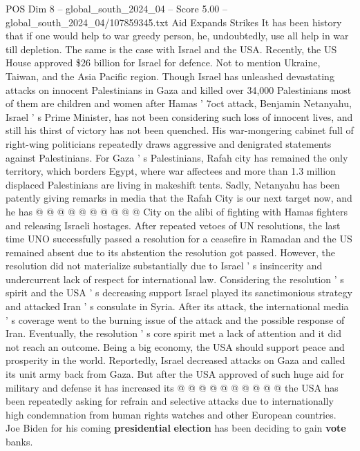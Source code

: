 \begin{textsample}{POS Dim 8 – global\_south\_2024\_04 – Score 5.00 – global\_south\_2024\_04/107859345.txt}  \label{ex:f8_pos_196}
Aid Expands Strikes It has been history that if one would help to war greedy person, he, undoubtedly, use all help in war till depletion.
The same is the case with Israel and the USA.
Recently, the US House approved \$26 billion for Israel for defence.
Not to mention Ukraine, Taiwan, and the Asia Pacific region.
Though Israel has unleashed devastating attacks on innocent Palestinians in Gaza and killed over 34,000 Palestinians most of them are children and women after Hamas ' 7oct attack, Benjamin Netanyahu, Israel ' s Prime Minister, has not been considering such loss of innocent lives, and still his thirst of victory has not been quenched.
His war-mongering cabinet full of right-wing politicians repeatedly draws aggressive and denigrated statements against Palestinians.
For Gaza ' s Palestinians, Rafah city has remained the only territory, which borders Egypt, where war affectees and more than 1.3 million displaced Palestinians are living in makeshift tents.
Sadly, Netanyahu has been patently giving remarks in media that the Rafah City is our next target now, and he has @ @ @ @ @ @ @ @ @ @ City on the alibi of fighting with Hamas fighters and releasing Israeli hostages.
After repeated vetoes of UN resolutions, the last time UNO successfully passed a resolution for a ceasefire in Ramadan and the US remained absent due to its abstention the resolution got passed.
However, the resolution did not materialize substantially due to Israel ' s insincerity and undercurrent lack of respect for international law.
Considering the resolution ' s spirit and the USA ' s decreasing support Israel played its sanctimonious strategy and attacked Iran ' s consulate in Syria.
After its attack, the international media ' s coverage went to the burning issue of the attack and the possible response of Iran.
Eventually, the resolution ' s core spirit met a lack of attention and it did not reach an outcome.
Being a big economy, the USA should support peace and prosperity in the world.
Reportedly, Israel decreased attacks on Gaza and called its unit army back from Gaza.
But after the USA approved of such huge aid for military and defense it has increased its @ @ @ @ @ @ @ @ @ @ the USA has been repeatedly asking for refrain and selective attacks due to internationally high condemnation from human rights watches and other European countries.
Joe Biden for his coming \textbf{presidential} \textbf{election} has been deciding to gain \textbf{vote} banks.

\end{textsample}
